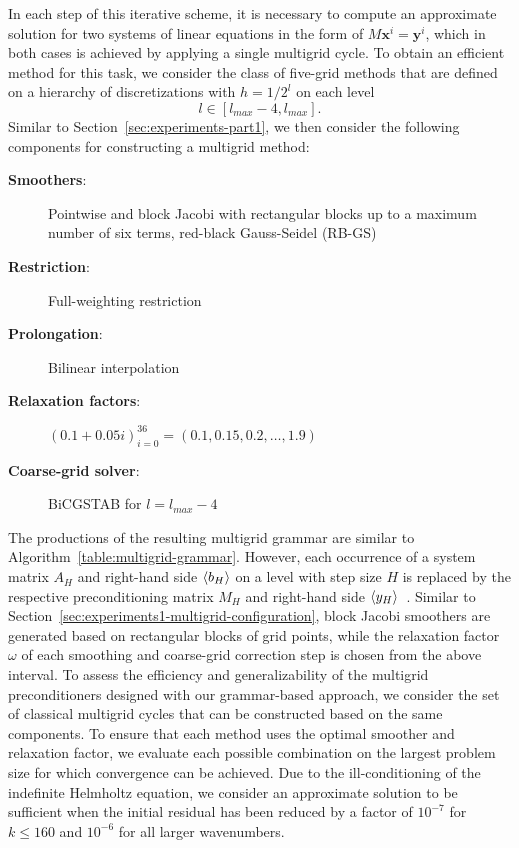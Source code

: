 In each step of this iterative scheme, it is necessary to compute an approximate solution for two systems of linear equations in the form of $M \bm{x}^i = \bm{y}^i$, %
which in both cases is achieved by applying a single multigrid cycle.
To obtain an efficient method for this task, we consider the class of five-grid methods that are defined on a hierarchy of discretizations with $h = 1/2^{l}$ on each level 
\begin{equation*}
    l \in \left[l_{max} - 4,l_{max}\right]. 
\end{equation*}
Similar to Section~\ref{sec:experiments-part1}, we then consider the following components for constructing a multigrid method:
\begin{description}
	\item[\textbf{Smoothers}:] Pointwise and block Jacobi with rectangular blocks up to a maximum number of six terms, red-black Gauss-Seidel (RB-GS)
	\item[\textbf{Restriction}:] Full-weighting restriction
	\item[\textbf{Prolongation}:] Bilinear interpolation
	\item[\textbf{Relaxation factors}:] $\left( 0.1 + 0.05i \right)_{i = 0}^{36} = \left(0.1, 0.15, 0.2, \dots, 1.9 \right)$
	\item[\textbf{Coarse-grid solver}:] BiCGSTAB for $l = l_{max} - 4$
\end{description}
The productions of the resulting multigrid grammar are similar to Algorithm~\ref{table:multigrid-grammar}. 
However, each occurrence of a system matrix $A_H$ and right-hand side $\langle b_H \rangle$ on a level with step size $H$ is replaced by the respective preconditioning matrix $M_H$ and right-hand side $\langle y_H \rangle$~\cite{schmitt2022evolving}.
Similar to Section~\ref{sec:experiments1-multigrid-configuration}, block Jacobi smoothers are generated based on rectangular blocks of grid points, while the relaxation factor $\omega$ of each smoothing and coarse-grid correction step is chosen from the above interval.
To assess the efficiency and generalizability of the multigrid preconditioners designed with our grammar-based approach, we consider the set of classical multigrid cycles that can be constructed based on the same components.
To ensure that each method uses the optimal smoother and relaxation factor, we evaluate each possible combination on the largest problem size for which convergence can be achieved.
Due to the ill-conditioning of the indefinite Helmholtz equation, we consider an approximate solution to be sufficient when the initial residual has been reduced by a factor of $10^{-7}$ for $k \leq 160$ and $10^{-6}$ for all larger wavenumbers.

